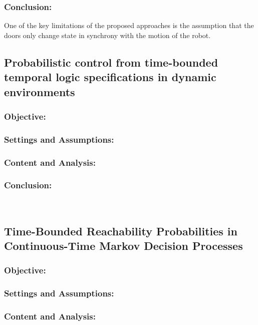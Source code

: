\documentclass{article}
\theoremstyle{definition}
\begin{document}
\subsubsection{Conclusion:}

One of the key limitations of the proposed approaches is the assumption that the doors only change state in synchrony with the motion of the robot.

\subsection{Probabilistic control from time-bounded temporal logic specifications in dynamic environments}
\subsubsection{Objective:}

\subsubsection{Settings and Assumptions:}

\subsubsection{Content and Analysis:}

\subsubsection{Conclusion:}


\\
\subsection{Time-Bounded Reachability Probabilities in Continuous-Time Markov Decision Processes}
\subsubsection{Objective:}

\subsubsection{Settings and Assumptions:}

\subsubsection{Content and Analysis:}
\end{document}
